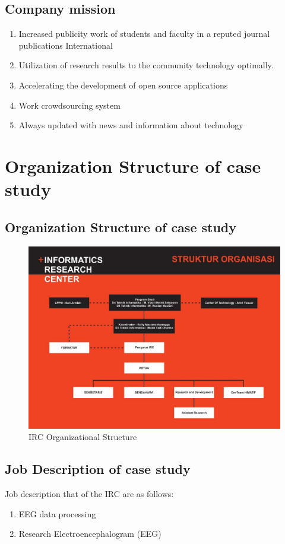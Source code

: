 \subsection{Company mission}
\begin{enumerate}
    \item Increased publicity work of students and faculty in a reputed journal publications International
    \item Utilization of research results to the community technology optimally.
    \item Accelerating the development of open source applications
    \item Work crowdsourcing system
    \item Always updated with news and information about technology
\end{enumerate}

\section{Organization Structure of case study}
\subsection{Organization Structure of case study}

\begin{figure}[h!]
\centering
\includegraphics[scale=0.2]{figures/strukturIRC.jpg}
\caption{IRC Organizational Structure}
\label{labelgambar3}
\end{figure}

\subsection{Job Description of case study}
Job description that of the IRC are as follows:
\begin{enumerate}
    \item EEG data processing
    \item Research Electroencephalogram (EEG) 
\end{enumerate}

